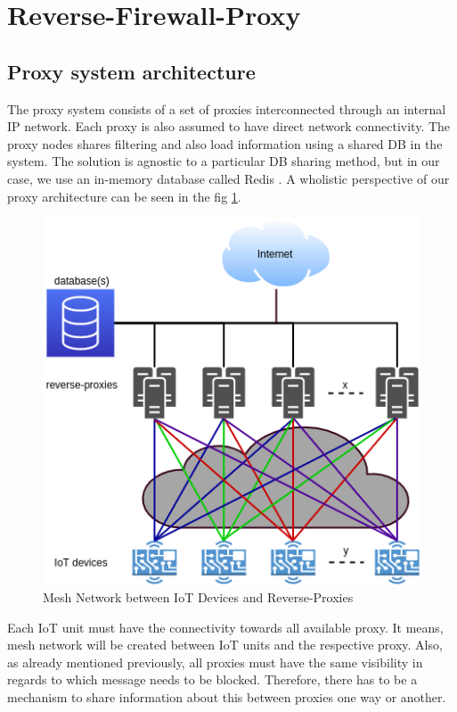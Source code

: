\documentclass[sigplan,screen]{acmart}
\begin{document}
\section{Reverse-Firewall-Proxy}
\subsection{Proxy system architecture}
The proxy system consists of a set of proxies interconnected through an internal IP network. Each proxy is also assumed to have direct network connectivity. The proxy nodes shares filtering and also load information using a shared DB in the system. The solution is agnostic to a particular DB sharing method, but in our case, we use an in-memory database called Redis \cite{redis}. A wholistic perspective of our proxy architecture can be seen in the fig \ref{proxies}.

\begin{figure}[htbp]
\centerline{\includegraphics[scale=0.35]{pic/proxies.png}}
\caption{Mesh Network between IoT Devices and Reverse-Proxies}
\label{proxies}
\end{figure}

Each IoT unit must have the connectivity towards all available proxy. It means, mesh network will be created between IoT units and the respective proxy. Also, as already mentioned previously, all proxies must have the same visibility in regards to which message needs to be blocked. Therefore, there has to be a mechanism to share information about this between proxies one way or another. 
\end{document}
